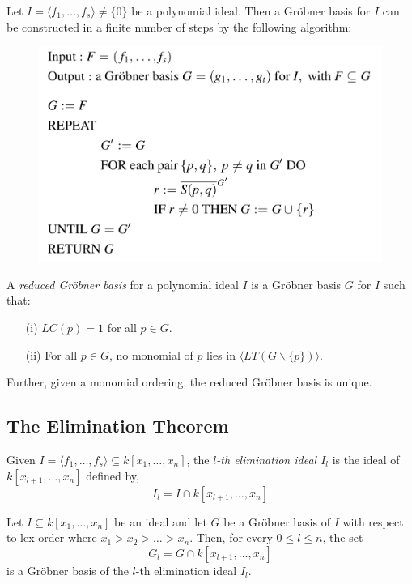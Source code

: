 \begin{theorem}
    Let $I = \langle f_1, \dots, f_s \rangle \neq \{ 0 \}$ be a polynomial ideal.
    Then a Gr\"obner basis for $I$ can be constructed in a finite number of steps by the following algorithm:
\end{theorem}
\begin{figure}[h!]
    \centering
    \includegraphics[width=.5\textwidth]{img/grobner_algo.png}
\end{figure}

\begin{definition}
    A \textit{reduced Gr\"obner basis} for a polynomial ideal $I$ is a Gr\"obner basis $G$ for $I$ such that:
    \begin{enumerate}
        \item[(i)] $LC(p) = 1$ for all $p \in G$.
        \item[(ii)] For all $p \in G$, no monomial of $p$ lies in $\langle LT(G \backslash \{ p \}) \rangle$.
    \end{enumerate}
    Further, given a monomial ordering, the reduced Gr\"obner basis is unique.
\end{definition}

\subsection{The Elimination Theorem}

\begin{definition}
    Given $I = \langle f_1, \dots, f_s \rangle \subseteq k[x_1, \dots, x_n]$, the \textit{$l$-th elimination ideal $I_l$} is the ideal of $k[x_{l+1}, \dots, x_n]$ defined by,
    $$I_l = I \cap k[x_{l+1}, \dots, x_n]$$
\end{definition}

\begin{theorem}
    Let $I \subseteq k[x_1, \dots, x_n]$ be an ideal and let $G$ be a Gr\"obner basis of $I$ with respect to lex order where $x_1 > x_2 > \dots > x_n$.
    Then, for every $0 \leq l \leq n$, the set
    $$G_l = G \cap k[x_{l+1}, \dots, x_n]$$
    is a Gr\"obner basis of the $l$-th elimination ideal $I_l$.
\end{theorem}

